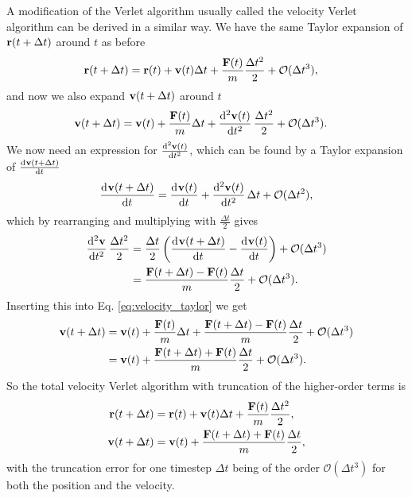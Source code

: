 A modification of the Verlet algorithm usually called the velocity Verlet algorithm\cite{swope1982computer}  can be derived in a similar way. We have the same Taylor expansion of $\mathbf{r}(t+\Delta t)$ around $t$ as before
\begin{align}
    \mathbf{r}(t + \Delta t) &= \mathbf{r}(t) + \mathbf{v}(t)\Delta t + \frac{\mathbf{F}(t)}{m}\frac{\Delta t^2}{2} + \mathcal{O}(\Delta t^3), \label{eq:position_taylor}
\end{align}
and now we also expand $\mathbf{v}(t + \Delta t)$ around $t$
\begin{align}
    \vvec(t + \Delta t) 
    &= \vvec(t) + \frac{\Fvec(t)}{m}\Delta t + \dod[2]{\vvec(t)}{t}\frac{\Delta t^2}{2} + \mathcal{O}(\Delta t^3).\label{eq:velocity_taylor}
\end{align}
We now need an expression for $\od[2]{\vvec(t)}{t}$, which can be found by a Taylor expansion of $\od{\vvec(t+\Delta t)}{t}$
\begin{align*}
    \dod{\vvec(t+\Delta t)}{t} = \dod{\vvec(t)}{t} + \dod[2]{\vvec(t)}{t}\Delta t + \mathcal{O}(\Delta t^2),
\end{align*}
which by rearranging and multiplying with $\frac{\Delta t}{2}$ gives
\begin{align*}
    \dod[2]{\vvec}{t}\frac{\Delta t^2}{2} 
    &= \frac{\Delta t}{2}\left( \dod{\vvec(t+\Delta t)}{t} - \dod{\vvec(t)}{t}\right) + \mathcal{O}(\Delta t^3) \\
    &= \frac{\Fvec(t + \Delta t) - \Fvec(t)}{m} \frac{\Delta t}{2} + \mathcal{O}(\Delta t^3).
\end{align*}
Inserting this into Eq. \eqref{eq:velocity_taylor} we get
\begin{align*}
    \mathbf{v}(t + \Delta t) 
    &= \mathbf{v}(t) + \frac{\mathbf{F}(t)}{m}\Delta t + \frac{\mathbf{F}(t + \Delta t) - \mathbf{F}(t)}{m} \frac{\Delta t}{2} + \mathcal{O}(\Delta t^3) \\
    &= \mathbf{v}(t) + \frac{\mathbf{F}(t + \Delta t) + \mathbf{F}(t)}{m} \frac{\Delta t}{2} + \mathcal{O}(\Delta t^3).
\end{align*}
So the total velocity Verlet algorithm with truncation of the higher-order terms is
\begin{align}
    \mathbf{r}(t + \Delta t) &= \mathbf{r}(t) + \mathbf{v}(t)\Delta t + \frac{\mathbf{F}(t)}{m}\frac{\Delta t^2}{2}, \label{eq:velocity_verlet_position}\\
    \mathbf{v}(t + \Delta t) &= \mathbf{v}(t) + \frac{\mathbf{F}(t + \Delta t) + \mathbf{F}(t)}{m} \frac{\Delta t}{2}\label{eq:velocity_verlet_velocity},
\end{align}
with the truncation error for one timestep $\Delta t$ being of the order $\mathcal{O}(\Delta t^3)$ for both the position and the velocity. 

